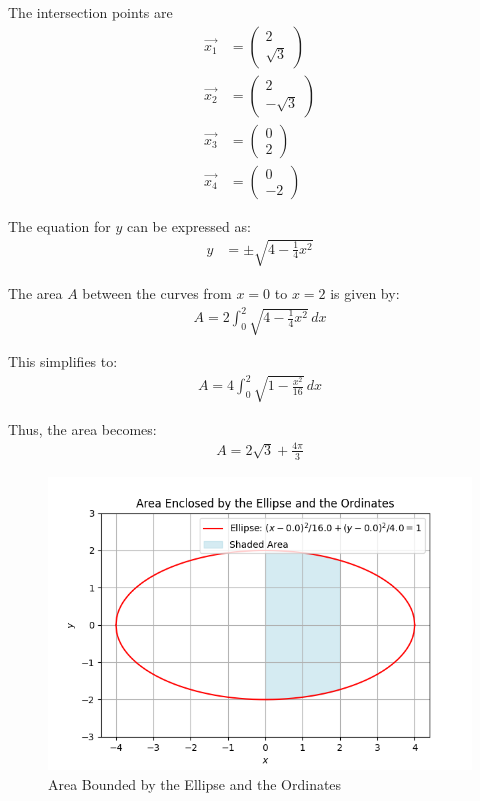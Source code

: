 \documentclass[journal]{IEEEtran}
\numberwithin{equation}{enumi}
\numberwithin{figure}{enumi}
\begin{document}
The intersection points are
\begin{align}
\vec{x_1} &= \begin{pmatrix} 2 \\ \sqrt{3} \end{pmatrix} \\
\vec{x_2} &= \begin{pmatrix} 2 \\ -\sqrt{3} \end{pmatrix} \\
\vec{x_3} &= \begin{pmatrix} 0 \\ 2 \end{pmatrix} \\
\vec{x_4} &= \begin{pmatrix} 0 \\ -2 \end{pmatrix}
\end{align}

The equation for \(y\) can be expressed as:
\begin{align}
y &= \pm \sqrt{4 - \frac{1}{4} x^2}
\end{align}

The area \(A\) between the curves from \(x = 0\) to \(x = 2\) is given by:
\begin{align}
A = 2 \int_0^2 \sqrt{4 - \frac{1}{4} x^2} \, dx
\end{align}

This simplifies to:
\begin{align}
A = 4 \int_0^2 \sqrt{1 - \frac{x^2}{16}} \, dx
\end{align}

Thus, the area becomes:
\begin{align}
A = 2\sqrt{3} + \frac{4\pi}{3}
\end{align}

\begin{figure}[!ht]
    \centering
    \includegraphics[width=\linewidth]{figs/fig1.png}
    \caption{Area Bounded by the Ellipse and the Ordinates}
\end{figure}
\end{document}
